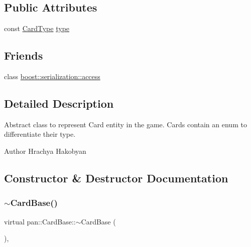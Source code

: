 \subsection*{Public Attributes}
\begin{DoxyCompactItemize}
\item 
const \hyperlink{namespacepan_a1f7350bfd0421afeabe9fa95c16fa811}{Card\+Type} \hyperlink{classpan_1_1_card_base_a47c25b9584c70305e862fcab7d0212ee}{type}
\end{DoxyCompactItemize}
\subsection*{Friends}
\begin{DoxyCompactItemize}
\item 
class \hyperlink{classpan_1_1_card_base_ac98d07dd8f7b70e16ccb9a01abf56b9c}{boost\+::serialization\+::access}
\end{DoxyCompactItemize}


\subsection{Detailed Description}
Abstract class to represent Card entity in the game. Cards contain an enum to differentiate their type. 

\begin{DoxyAuthor}{Author}
Hrachya Hakobyan 
\end{DoxyAuthor}


\subsection{Constructor \& Destructor Documentation}
\mbox{\label{classpan_1_1_card_base_a85b2e83d4d62dad2f43a91277cbdf974}} 
\subsubsection{\texorpdfstring{$\sim$\+Card\+Base()}{~CardBase()}}
{\footnotesize\ttfamily virtual pan\+::\+Card\+Base\+::$\sim$\+Card\+Base (\begin{DoxyParamCaption}{ }\end{DoxyParamCaption})\hspace{0.3cm}{\ttfamily [virtual]}, {\ttfamily [default]}}

